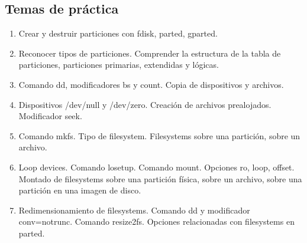 \subsection{Temas de práctica}
\begin{enumerate}
	\item Crear y destruir particiones con fdisk, parted, gparted. 
	\item Reconocer tipos de particiones. Comprender la estructura de la tabla de particiones, particiones primarias, extendidas y lógicas.
	\item Comando dd, modificadores bs y count. Copia de dispositivos y archivos.
	\item Dispositivos /dev/null y /dev/zero. Creación de archivos prealojados. Modificador seek. 
	\item Comando mkfs. Tipo de filesystem. Filesystems sobre una partición, sobre un archivo.
	\item Loop devices. Comando losetup. Comando mount. Opciones ro, loop, offset. Montado de filesystems sobre una partición física, sobre un archivo, sobre una partición en una imagen de disco.
	\item Redimensionamiento de filesystems. Comando dd y modificador conv=notrunc. Comando resize2fs. Opciones relacionadas con filesystems en parted.
\end{enumerate}


